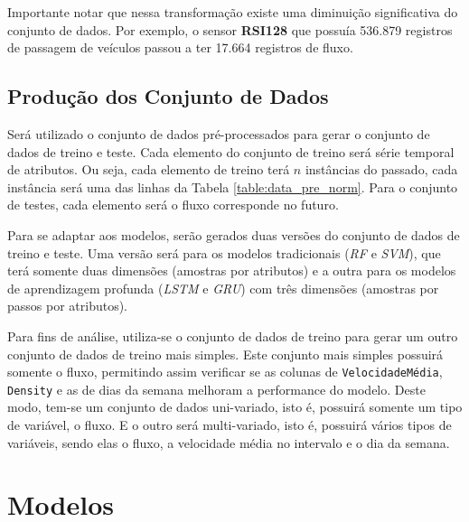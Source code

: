Importante notar que nessa transformação existe uma diminuição significativa do conjunto de dados. Por exemplo, o sensor \textbf{RSI128} que possuía 536.879 registros de passagem de veículos passou a ter 17.664 registros de fluxo.



\subsection{Produção dos Conjunto de Dados}

Será utilizado o conjunto de dados pré-processados para gerar o conjunto de dados de treino e teste. Cada elemento do conjunto de treino será série temporal de atributos. Ou seja, cada elemento de treino terá \(n\) instâncias do passado, cada instância será uma das linhas da Tabela \ref{table:data_pre_norm}. Para o conjunto de testes, cada elemento será o fluxo corresponde no futuro.


Para se adaptar aos modelos, serão gerados duas versões do conjunto de dados de treino e teste. Uma versão será para os modelos tradicionais (\textit{\acrshort{RF}} e \textit{\acrshort{SVM}}), que terá somente duas dimensões (amostras por atributos) e a outra para os modelos de aprendizagem profunda (\textit{\acrshort{LSTM}} e \textit{\acrshort{GRU}}) com três dimensões (amostras por passos por atributos).

Para fins de análise, utiliza-se o conjunto de dados de treino para gerar um outro conjunto de dados de treino mais simples. Este conjunto mais simples possuirá somente o fluxo, permitindo assim verificar se as colunas de \texttt{VelocidadeMédia}, \texttt{Density} e as de dias da semana melhoram a performance do modelo. Deste modo, tem-se um conjunto de dados uni-variado, isto é, possuirá somente um tipo de variável, o fluxo. E o outro será multi-variado, isto é, possuirá vários tipos de variáveis, sendo elas o fluxo, a velocidade média no intervalo e o dia da semana.

\section{Modelos}

